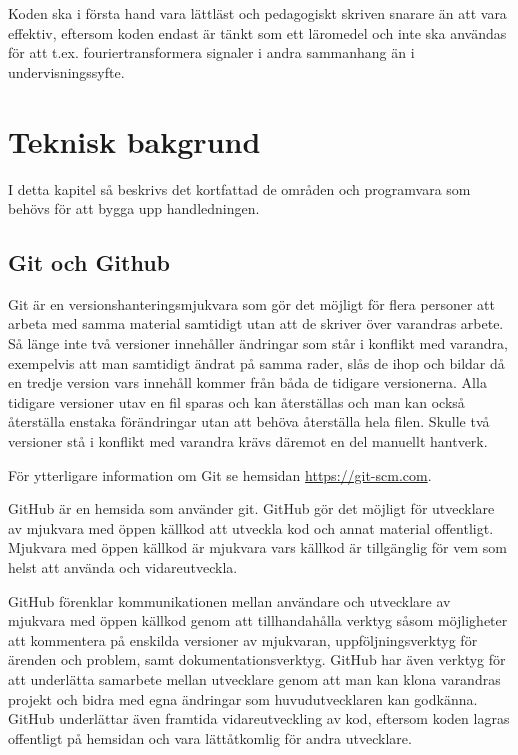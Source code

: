 \documentclass[]{article}
\begin{document}
Koden ska i första hand vara lättläst och pedagogiskt skriven snarare än att vara effektiv, eftersom koden endast är
tänkt som ett läromedel och inte ska användas för att t.ex. fouriertransformera signaler i andra sammanhang än i
undervisningssyfte.


\section{Teknisk bakgrund}
I detta kapitel så beskrivs det kortfattad de områden och programvara som
behövs för att bygga upp handledningen.

\subsection{Git och Github}
Git är en versionshanteringsmjukvara som gör det möjligt för flera personer att arbeta med samma material samtidigt utan
att de skriver över varandras arbete. Så länge inte två versioner innehåller ändringar som står i konflikt med varandra,
exempelvis att man samtidigt ändrat på samma rader, slås de ihop och bildar då en tredje version vars innehåll kommer
från båda de tidigare versionerna. Alla tidigare versioner utav en fil sparas och kan återställas och man kan också
återställa enstaka förändringar utan att behöva återställa hela filen. Skulle två versioner stå i konflikt med varandra
krävs däremot en del manuellt hantverk.

För ytterligare information om Git se hemsidan \url{https://git-scm.com}.

GitHub är en hemsida som använder git. GitHub gör det möjligt för utvecklare av mjukvara med öppen källkod att utveckla
kod och annat material offentligt. Mjukvara med öppen källkod är mjukvara vars källkod är tillgänglig för vem som helst
att använda och vidareutveckla.

GitHub förenklar kommunikationen mellan användare och utvecklare av mjukvara med öppen källkod genom att tillhandahålla
verktyg såsom möjligheter att kommentera på enskilda versioner av mjukvaran, uppföljningsverktyg för ärenden och problem,
samt dokumentationsverktyg. GitHub har även verktyg för att underlätta samarbete mellan utvecklare genom att man kan
klona varandras projekt och bidra med egna ändringar som huvudutvecklaren kan godkänna. GitHub underlättar även framtida
vidareutveckling av kod, eftersom koden lagras offentligt på hemsidan och vara lättåtkomlig för andra utvecklare.
\end{document}
